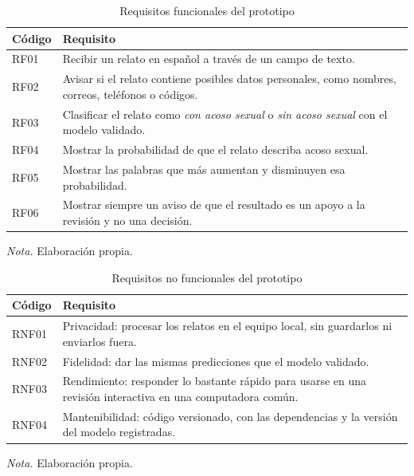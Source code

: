 \begin{table}[H]
\begin{threeparttable}
\caption{Requisitos funcionales del prototipo}
\label{tab:rf}
\singlespacing\small
\renewcommand{\arraystretch}{1.25}
\begin{tabular}{@{}L{1.5cm} L{13.9cm}@{}}
\toprule
\textbf{Código} & \textbf{Requisito} \\
\midrule
RF01 & Recibir un relato en español a través de un campo de texto. \\
RF02 & Avisar si el relato contiene posibles datos personales, como nombres, correos, teléfonos o códigos. \\
RF03 & Clasificar el relato como \textit{con acoso sexual} o \textit{sin acoso sexual} con el modelo validado. \\
RF04 & Mostrar la probabilidad de que el relato describa acoso sexual. \\
RF05 & Mostrar las palabras que más aumentan y disminuyen esa probabilidad. \\
RF06 & Mostrar siempre un aviso de que el resultado es un apoyo a la revisión y no una decisión. \\
\bottomrule
\end{tabular}
\begin{tablenotes}[flushleft]
\small
\item \textit{Nota.} Elaboración propia.
\end{tablenotes}
\end{threeparttable}
\end{table}

\begin{table}[H]
\begin{threeparttable}
\caption{Requisitos no funcionales del prototipo}
\label{tab:rnf}
\singlespacing\small
\renewcommand{\arraystretch}{1.25}
\begin{tabular}{@{}L{1.5cm} L{13.9cm}@{}}
\toprule
\textbf{Código} & \textbf{Requisito} \\
\midrule
RNF01 & Privacidad: procesar los relatos en el equipo local, sin guardarlos ni enviarlos fuera. \\
RNF02 & Fidelidad: dar las mismas predicciones que el modelo validado. \\
RNF03 & Rendimiento: responder lo bastante rápido para usarse en una revisión interactiva en una computadora común. \\
RNF04 & Mantenibilidad: código versionado, con las dependencias y la versión del modelo registradas. \\
\bottomrule
\end{tabular}
\begin{tablenotes}[flushleft]
\small
\item \textit{Nota.} Elaboración propia.
\end{tablenotes}
\end{threeparttable}
\end{table}

